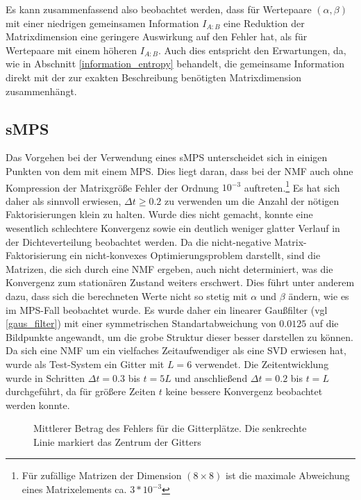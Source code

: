 \documentclass[10pt,a4paper]{report}
\begin{document}
 Es kann zusammenfassend also beobachtet werden, dass für Wertepaare $(\alpha,\beta)$ mit einer niedrigen gemeinsamen Information $I_{A:B}$ eine Reduktion der Matrixdimension eine geringere Auswirkung auf den Fehler hat, als für Wertepaare mit einem höheren $I_{A:B}$.
Auch dies entspricht den Erwartungen, da, wie in Abschnitt \ref{information_entropy} behandelt, die gemeinsame Information direkt mit der zur exakten Beschreibung benötigten Matrixdimension zusammenhängt.



\subsection{sMPS}

Das Vorgehen bei der Verwendung eines sMPS unterscheidet sich in einigen Punkten von dem mit einem MPS. Dies liegt daran, dass bei der NMF auch ohne Kompression der Matrixgröße Fehler der Ordnung $10^{-3}$ auftreten.\footnote{Für zufällige Matrizen der Dimension $(8\times 8)$ ist die maximale Abweichung eines Matrixelements ca. $3*10^{-3}$} Es hat sich daher als sinnvoll erwiesen, $\Delta t\geq 0.2$ zu verwenden um die Anzahl der nötigen Faktorisierungen klein zu halten. Wurde dies nicht gemacht, konnte eine wesentlich schlechtere Konvergenz sowie ein deutlich weniger glatter Verlauf in der Dichteverteilung beobachtet werden. Da die nicht-negative Matrix-Faktorisierung ein nicht-konvexes Optimierungsproblem darstellt, sind die Matrizen, die sich durch eine NMF ergeben, auch nicht determiniert, was die Konvergenz zum stationären Zustand weiters erschwert. Dies führt unter anderem dazu, dass sich die berechneten Werte nicht so stetig mit $\alpha$ und $\beta$ ändern, wie es im MPS-Fall beobachtet wurde. Es wurde daher ein linearer Gaußfilter (vgl \ref{gaus_filter}) mit einer symmetrischen Standartabweichung von $0.0125$ auf die Bildpunkte angewandt, um die grobe Struktur dieser besser darstellen zu können.\\

Da sich eine NMF um ein vielfaches Zeitaufwendiger als eine SVD erwiesen hat, wurde als Test-System ein Gitter mit $L=6$ verwendet. Die Zeitentwicklung wurde in Schritten $\Delta t=0.3$ bis $t=5L$ und anschließend $\Delta t=0.2$ bis $t=L$ durchgeführt, da für größere Zeiten $t$ keine bessere Konvergenz beobachtet werden konnte.

\begin{figure}
\centering
{}
\caption{Mittlerer Betrag des Fehlers für die Gitterplätze. Die senkrechte Linie markiert das Zentrum der Gitters} \label{L_error}
\end{figure}
\end{document}
